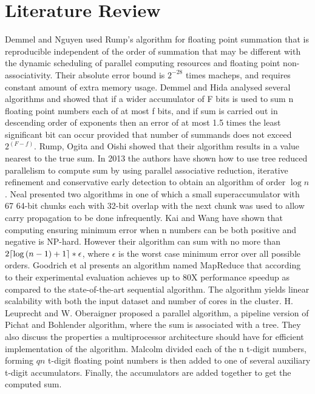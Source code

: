 \documentclass[11pt]{article}       %
\DeclarePairedDelimiter{\ceil}{\lceil}{\rceil}
\begin{document}
\section{Literature Review} \label{litrev}

Demmel and Nguyen \cite{PRS} used Rump’s algorithm for floating point summation that is reproducible independent of the order of summation that may be different with the dynamic scheduling of parallel computing resources and floating point non-associativity. Their absolute error bound is $2^{-28}$ times macheps, and requires constant amount of extra memory usage. Demmel and Hida \cite{AEFPS} analysed several algorithms and showed that if a wider accumulator of F bits is used to sum n floating point numbers each of at most f bits, and if sum is carried out in descending order of exponents then an error of at most 1.5 times the least significant bit can occur provided that number of summands does not exceed $2^{(F-f)}$.
Rump, Ogita and Oishi \cite{AFPSPFR} showed that their algorithm results in a value nearest to the true sum. 
In 2013 the authors \cite{APFPA} have shown how to use tree reduced parallelism to compute sum by using parallel associative reduction, iterative refinement and conservative early detection to obtain an algorithm of order $\log {n}$. 
Neal \cite{FESUSLS} presented two algorithms in one of which a small superaccumulator with 67 64-bit chunks each with 32-bit overlap with the next chunk was used to allow carry propagation to be done infrequently. Kai and Wang \cite{LTALCNS} have shown that computing ensuring minimum error when n numbers can be both positive and negative is NP-hard. However their algorithm can sum with no more than $2\ceil*{\log {(n-1)}+1}*\epsilon$, where $\epsilon$ is the worst case minimum error over all possible orders.
Goodrich et al \cite{PASFPN} presents an algorithm named MapReduce that according to their experimental evaluation achieves up to 80X performance speedup as compared to the state-of-the-art sequential algorithm. The algorithm yields linear scalability with both the input dataset and number of cores in the cluster.
H. Leuprecht and W. Oberaigner \cite{PARESFP} proposed a parallel algorithm, a pipeline version of Pichat and Bohlender algorithm, where the sum is associated with a tree. They also discuss the properties a multiprocessor architecture should have for efficient implementation of the algorithm.
Malcolm \cite{OAFPS} divided each of the n t-digit numbers, forming $qn$ t-digit floating point numbers is then added to one of several  auxiliary t-digit accumulators. Finally, the accumulators are added together to get the computed sum.
\end{document}
